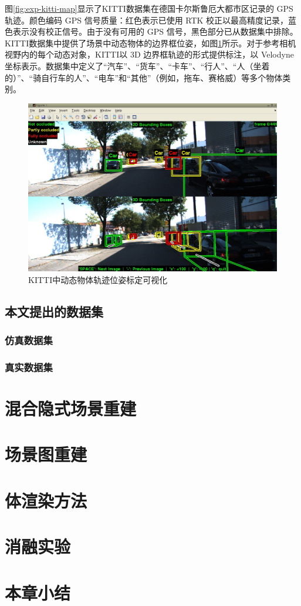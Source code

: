 图\ref{fig:exp-kitti-map}显示了KITTI数据集在德国卡尔斯鲁厄大都市区记录的 GPS 轨迹。颜色编码 GPS 信号质量：红色表示已使用 RTK 校正以最高精度记录，蓝色表示没有校正信号。由于没有可用的 GPS 信号，黑色部分已从数据集中排除。
KITTI数据集中提供了场景中动态物体的边界框位姿，如图\ref{fig:exp-kitti-objpose}所示。对于参考相机视野内的每个动态对象，KITTI以 3D 边界框轨迹的形式提供标注，以 Velodyne 坐标表示。数据集中定义了“汽车”、“货车”、“卡车”、“行人”、“人（坐着的）”、“骑自行车的人”、“电车”和“其他”（例如，拖车、赛格威）等多个物体类别。

\begin{figure}[ht]
    \centering
    \includegraphics[width=\textwidth]{undergraduate-thesis/images/experiments/kitti-objects.png}
    \caption{KITTI中动态物体轨迹位姿标定可视化}
    \label{fig:exp-kitti-objpose}
\end{figure}



\subsection{本文提出的数据集}
\subsubsection{仿真数据集}

\subsubsection{真实数据集}

\section{混合隐式场景重建}


\section{场景图重建}

\section{体渲染方法}

\section{消融实验}

\section{本章小结}